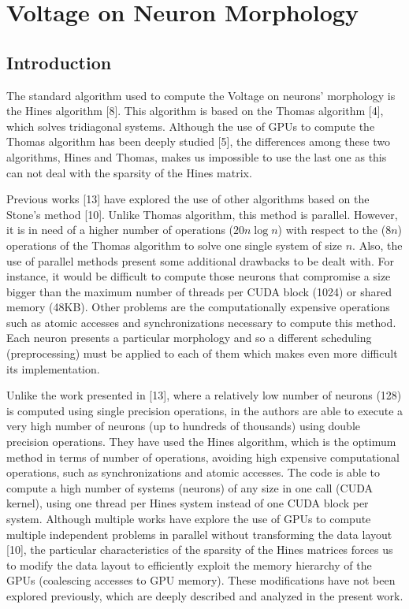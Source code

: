 
\chapter{Voltage on Neuron Morphology}

\section{Introduction}

The standard algorithm used to compute the Voltage on neurons' morphology
 is the Hines algorithm [8]. This algorithm is based on the Thomas 
 algorithm [4], which solves tridiagonal systems. Although the use of
  GPUs to compute the Thomas algorithm has been deeply studied 
  [5], the differences among these two algorithms,
   Hines and Thomas, makes us impossible to use the last one as this 
   can not deal with the sparsity of the Hines matrix.

Previous works [13] have explored the use of other algorithms based on
 the Stone's method [10]. Unlike Thomas algorithm, this method is
  parallel. However, it is in need of a higher number of operations 
  ($20 n \log n$) with respect to the ($8n$) operations of the Thomas
   algorithm to solve one single system of size $n$. Also, the use of 
   parallel methods present some additional drawbacks to be dealt with.
    For instance, it would be difficult to compute those neurons that
     compromise a size bigger than the maximum number of threads per CUDA block (1024) or shared memory (48KB). Other problems are the computationally expensive operations such as atomic accesses and synchronizations necessary to compute this method. Each neuron presents a particular morphology and so a different scheduling (preprocessing) must be applied to each of them which makes even more difficult its implementation.

Unlike the work presented in [13], where a relatively low number of 
neurons (128) is computed using single precision operations, in \cite{cuHines}
 the authors are able to execute a very high number of neurons 
 (up to hundreds of thousands) using double precision operations. 
 They have used the Hines algorithm, which is the optimum method in 
 terms of number of operations, avoiding high expensive computational
  operations, such as synchronizations and atomic accesses. The code
   is able to compute a high number of systems (neurons) of any size in
    one call (CUDA kernel), using one thread per Hines system instead of
     one CUDA block per system. Although multiple works have explore the
      use of GPUs to compute multiple independent problems in parallel
       without transforming the data layout [10], the 
       particular characteristics of the sparsity of the Hines matrices
        forces us to modify the data layout to efficiently exploit the 
        memory hierarchy of the GPUs (coalescing accesses to GPU memory).
         These modifications have not been explored previously, which are
          deeply described and analyzed in the present work.


